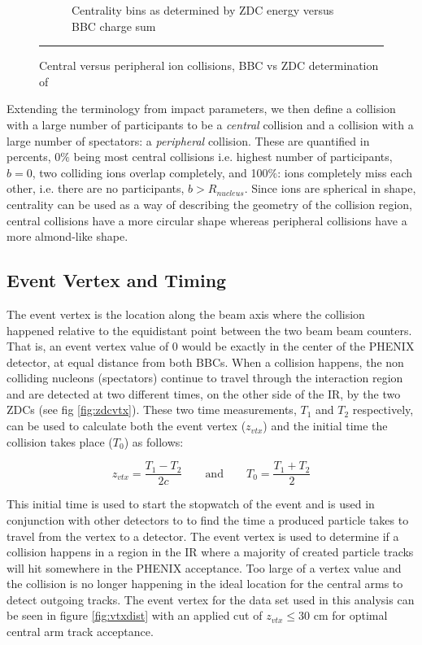\begin{figure}[htbp!]
\begin{subfigure}[p]{1\textwidth}
  \caption[Centrality bins as determined by ZDC energy versus BBC charge sum]{Centrality bins as determined by ZDC energy versus BBC charge sum\citep{Ghosh2001}}
  \label{fig:zdcvsbbc}
\end{subfigure}

    \rule{35em}{0.5pt}
  \caption[Central versus peripheral ion collisions, BBC vs ZDC determination of]{Central versus peripheral ion collisions, BBC vs ZDC determination of}
  \label{fig:centralvsperipheral}
\end{figure}


Extending the terminology from impact parameters, we then define a collision with a large number of participants to be a \textit{central} collision and a collision with a large number of spectators: a \textit{peripheral} collision. These are quantified in percents, 0$\%$ being most central collisions i.e. highest number of participants, $b=0$, two colliding ions overlap completely, and 100$\%$: ions completely miss each other, i.e. there are no participants, $b > R_{nucleus}$. Since ions are spherical in shape, centrality can be used as a way of describing the geometry of the collision region, central collisions have a more circular shape whereas peripheral collisions have a more almond-like shape.



\subsection{Event Vertex and Timing}
\label{sect:timeandvtx}
The event vertex is the location along the beam axis where the collision happened relative to the equidistant point between the two beam beam counters. That is, an event vertex value of 0 would be exactly in the center of the PHENIX detector, at equal distance from both BBCs. When a collision happens, the non colliding nucleons (spectators) continue to travel through the interaction region and are detected at two different times, on the other side of the IR, by the two ZDCs (see fig \ref{fig:zdcvtx}). These two time measurements, $T_1$ and $T_2$ respectively, can be used to calculate both the event vertex ($z_{vtx}$) and the initial time the collision takes place ($T_0$) as follows\citep{Mitchell:2002wu}:

\begin{equation}
 z_{vtx} = \frac{T_1 - T_2}{2c} \qquad\text{and}\qquad T_0 = \frac{T_1 + T_2}{2}
\end{equation}

This initial time is used to start the stopwatch of the event and is used in conjunction with other detectors to to find the time a produced particle takes to travel from the vertex to a detector. The event vertex is used to determine if a collision happens in a region in the IR where a majority of created particle tracks will hit somewhere in the PHENIX acceptance. Too large of a vertex value and the collision is no longer happening in the ideal location for the central arms to detect outgoing tracks. The event vertex for the data set used in this analysis can be seen in figure \ref{fig:vtxdist} with an applied cut of $z_{vtx} \leq 30$ cm for optimal central arm track acceptance.

